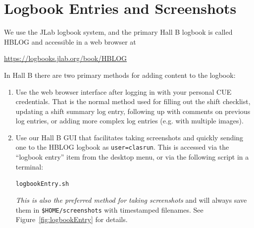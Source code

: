 \documentclass[amsmath,amssymb,notitlepage,11pt]{revtex4}
\begin{document}
\section{Logbook Entries and Screenshots}\label{sec:logentry}
We use the JLab logbook system, and the primary Hall B logbook is called HBLOG and accessible in a web browser at
\begin{center}\url{https://logbooks.jlab.org/book/HBLOG}\end{center}
In Hall B there are two primary methods for adding content to the logbook:
\begin{enumerate}
\item Use the web browser interface after logging in with your personal CUE credentials.  That is the normal method used for filling out the shift checklist, updating a shift summary log entry, following up with comments on previous log entries, or adding more complex log entries (e.g. with multiple images).
\item Use our Hall B GUI that facilitates taking screenshots and quickly sending one to the HBLOG logbook as \texttt{user=clasrun}.  This is accessed via the ``logbook entry'' item from the desktop menu, or via the following script in a terminal:
\begin{center}\texttt{logbookEntry.sh}\end{center}
    {\em This is also the preferred method for taking screenshots} and will always save them in \texttt{\$HOME/screenshots} with timestamped filenames.  See Figure~\ref{fig:logbookEntry} for details.
\end{enumerate}
\end{document}
